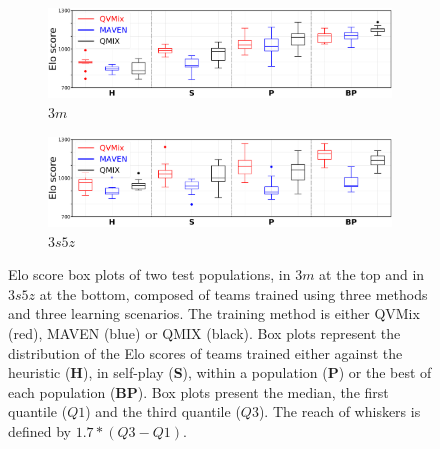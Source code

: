 \begin{figure}[ht]
\centering

\begin{subfigure}{\textwidth}
\centering
\includegraphics[width=\textwidth]{tex_thesis/figures/ch7/3m_tiny_all_no_h_clean.pdf}
\caption{$3m$}
\label{subfig:3m_all_no_h}
\end{subfigure}
\begin{subfigure}{\textwidth}
\centering
\includegraphics[width=\textwidth]{tex_thesis/figures/ch7/3s5z_tiny_all_no_h_clean.pdf}
\caption{$3s5z$}
\label{subfig:3s5z_all_no_h}
\end{subfigure}
\caption{
Elo score box plots of two test populations, in $3m$ at the top and in $3s5z$ at the bottom, composed of teams trained using three methods and three learning scenarios.
The training method is either QVMix (red), MAVEN (blue) or QMIX (black).
Box plots represent the distribution of the Elo scores of teams trained either against the heuristic (\textbf{H}), in self-play (\textbf{S}), within a population (\textbf{P}) or the best of each population (\textbf{BP}).
Box plots present the median, the first quantile ($Q1$) and the third quantile ($Q3$). The reach of whiskers is defined by $1.7*(Q3-Q1)$.
}
\label{fig:all_no_h}
\end{figure}

